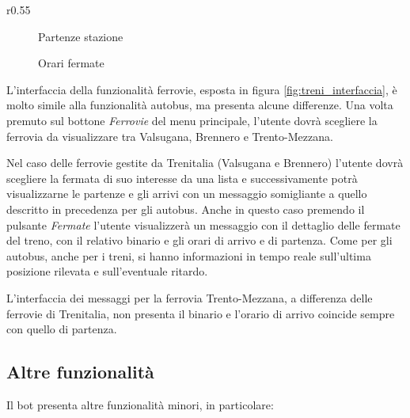 \begin{wrapfigure}{r}{0.55\textwidth}
    \centering 
\begin{subfigure}{0.23\textwidth}
\centering
{}
\caption{Partenze stazione}
\label{fig:bot-partenze-treno}
\end{subfigure}\hfil
\begin{subfigure}{0.23\textwidth}
\centering
{}
\caption{Orari fermate}
\label{fig:bot-fermate-treno}
\end{subfigure}
\caption{
\label{fig:treni_interfaccia}Interfaccia funzionalità treni}
\end{wrapfigure}

L'interfaccia della funzionalità ferrovie, esposta in figura \ref{fig:treni_interfaccia}, è molto simile alla funzionalità autobus, ma presenta alcune differenze. Una volta premuto sul bottone \textit{Ferrovie} del menu principale, l'utente dovrà scegliere la ferrovia da visualizzare tra Valsugana, Brennero e Trento-Mezzana. 

Nel caso delle ferrovie gestite da Trenitalia (Valsugana e Brennero) l'utente dovrà scegliere la fermata di suo interesse da una lista e successivamente potrà visualizzarne le partenze e gli arrivi con un messaggio somigliante a quello descritto in precedenza per gli autobus. Anche in questo caso premendo il pulsante \textit{Fermate} l'utente visualizzerà un messaggio con il dettaglio delle fermate del treno, con il relativo binario e gli orari di arrivo e di partenza. Come per gli autobus, anche per i treni, si hanno informazioni in tempo reale sull'ultima posizione rilevata e sull'eventuale ritardo.

L'interfaccia dei messaggi per la ferrovia Trento-Mezzana, a differenza delle ferrovie di Trenitalia, non presenta il binario e l'orario di arrivo coincide sempre con quello di partenza.

\pagebreak

\subsection{Altre funzionalità}
\label{sec:altre_funzionalita}

Il bot presenta altre funzionalità minori, in particolare:

